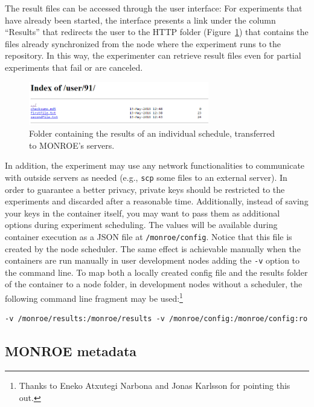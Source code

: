 \documentclass[a4paper,10pt]{article}
\newcommand{\monroe}{MONROE}
\newcommand{\identifier}[1]{{\texttt{\small{#1}}}}
\begin{document}
The result files can be accessed through the user interface:
For experiments that have already been started, the interface presents a link under the column ``Results'' that redirects the user to the HTTP folder (Figure~\ref{fig:ResultsRetrieval}) that contains the files already synchronized from the node where the experiment runs to the repository.
In this way, the experimenter can retrieve result files even for partial experiments that fail or are canceled.

\begin{figure}[tp]
	\centering
	\includegraphics[width=0.7\textwidth]{ResultsRetrieval.png}
	\caption{Folder containing the results of an individual schedule, transferred to \monroe{}'s servers.}
	\label{fig:ResultsRetrieval}
	\end{figure}

In addition, the experiment may use any network functionalities to communicate with outside servers as needed (e.g., \identifier{scp} some files to an external server).
In order to guarantee a better privacy, private keys should be restricted to the experiments and discarded after a reasonable time.
Additionally, instead of saving your keys in the container itself, you may want to pass them as additional options during experiment scheduling.
The values will be available during container execution as a JSON file at \identifier{/monroe/config}.
Notice that this file is created by the node scheduler.
The same effect is achievable manually when the containers are run manually in user development nodes adding the \identifier{-v} option to the command line.
To map both a locally created config file and the results folder of the container to a node folder, in development nodes without a scheduler, the following command line fragment may be used:\footnote{Thanks to Eneko Atxutegi Narbona and Jonas Karlsson for pointing this out.}
\begin{verbatim}
-v /monroe/results:/monroe/results -v /monroe/config:/monroe/config:ro
\end{verbatim}

\subsection{\monroe{} metadata}
\end{document}
